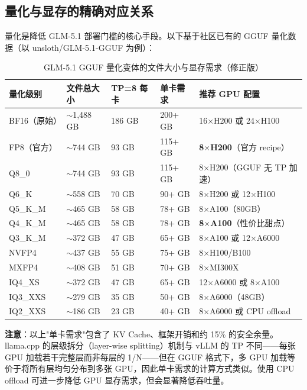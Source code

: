 \documentclass[UTF8,a4paper,10pt,oneside]{ctexart}
\begin{document}
\subsection{量化与显存的精确对应关系}

量化是降低 GLM-5.1 部署门槛的核心手段。以下基于社区已有的 GGUF 量化数据（以 unsloth/GLM-5.1-GGUF 为例）：

\begin{table}[htbp]
\centering
\caption{GLM-5.1 GGUF 量化变体的文件大小与显存需求（修正版）}
\begin{tabular}{p{2.5cm}p{2.2cm}p{2cm}p{1.8cm}p{3.2cm}}
\hline
\textbf{量化级别} & \textbf{文件总大小} & \textbf{TP=8 每卡} & \textbf{单卡需求} & \textbf{推荐 GPU 配置} \\
\hline
BF16（原始） & $\sim$1,488 GB & 186 GB & 200+ GB & 16$\times$H200 或 24$\times$H100 \\
FP8（官方） & $\sim$744 GB & 93 GB & 115+ GB & \textbf{8$\times$H200}（官方 recipe）\\
Q8\_0 & $\sim$744 GB & 93 GB & 115+ GB & 8$\times$H200（GGUF 无 TP 加速）\\
Q6\_K & $\sim$558 GB & 70 GB & 90+ GB & 8$\times$H200 或 12$\times$H100 \\
Q5\_K\_M & $\sim$465 GB & 58 GB & 78+ GB & 8$\times$A100（80GB）\\
Q4\_K\_M & $\sim$465 GB & 58 GB & 78+ GB & \textbf{8$\times$A100}（性价比甜点）\\
Q3\_K\_M & $\sim$372 GB & 47 GB & 65+ GB & 8$\times$A100 或 12$\times$A6000 \\
NVFP4 & $\sim$437 GB & 55 GB & 75+ GB & 8$\times$H100/B100 \\
MXFP4 & $\sim$408 GB & 51 GB & 70+ GB & 8$\times$MI300X \\
IQ4\_XS & $\sim$372 GB & 47 GB & 65+ GB & 12$\times$A6000 或 8$\times$A100 \\
IQ3\_XXS & $\sim$279 GB & 35 GB & 50+ GB & 8$\times$A6000（48GB）\\
IQ2\_XXS & $\sim$186 GB & 23 GB & 40+ GB & 8$\times$A6000 或 CPU offload \\
\hline
\end{tabular}
\end{table}

\textbf{注意}：以上"单卡需求"包含了 KV Cache、框架开销和约 15\% 的安全余量。llama.cpp 的层级拆分（layer-wise splitting）机制与 vLLM 的 TP 不同——每张 GPU 加载若干完整层而非每层的 1/N——但在 GGUF 格式下，多 GPU 加载等价于将所有层均匀分布到多张 GPU，因此单卡需求的计算方式类似。使用 CPU offload 可进一步降低 GPU 显存需求，但会显著降低吞吐量。
\end{document}
